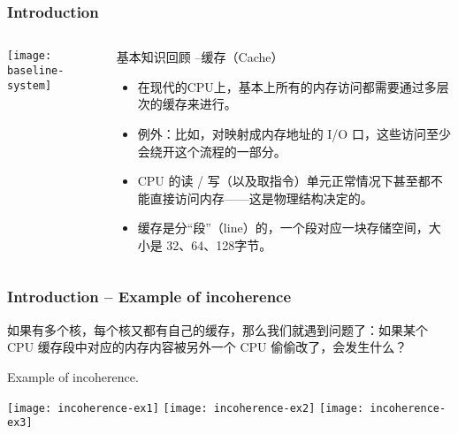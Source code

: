 \begin{frame}[plain]	
	\frametitle{Introduction}
	
	
	\begin{columns}
		
		\begin{column}{.4\textwidth}
			\texttt{[image: baseline-system]}
		\end{column}
		\begin{column}{.6\textwidth}
			基本知识回顾 --缓存（Cache）
			\begin{itemize}
				\item 在现代的CPU上，基本上所有的内存访问都需要通过多层次的缓存来进行。
				\item 例外：比如，对映射成内存地址的 I/O 口，这些访问至少会绕开这个流程的一部分。
				\item CPU 的读 / 写（以及取指令）单元正常情况下甚至都不能直接访问内存——这是物理结构决定的。
				\item 缓存是分“段”（line）的，一个段对应一块存储空间，大小是 32、64、128字节。
			\end{itemize}

		\end{column}
	\end{columns}
	
\end{frame}

\begin{frame}[plain]
	\frametitle{Introduction -- Example of incoherence}
   如果有多个核，每个核又都有自己的缓存，那么我们就遇到问题了：如果某个 CPU 缓存段中对应的内存内容被另外一个 CPU 偷偷改了，会发生什么？
	
	Example of incoherence. 
	
	
	\texttt{[image: incoherence-ex1]}
	\texttt{[image: incoherence-ex2]}
	\centering
	\texttt{[image: incoherence-ex3]}
\end{frame}


